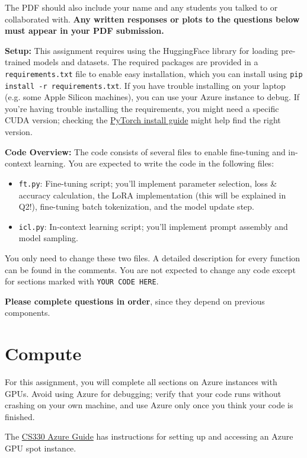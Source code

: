 \documentclass[12pt]{article}
\begin{document}
    The PDF should also include your name and any students you talked to or collaborated with. \textbf{Any written responses or plots to the questions below must appear in your PDF submission.}

    \textbf{Setup:} This assignment requires using the HuggingFace library for loading pre-trained models and datasets. The required packages are provided in a \texttt{requirements.txt} file to enable easy installation, which you can install using \texttt{pip install -r requirements.txt}. If you have trouble installing on your laptop (e.g. some Apple Silicon machines), you can use your Azure instance to debug. If you're having trouble installing the requirements, you might need a specific CUDA version; checking the \href{https://pytorch.org/get-started/locally/}{PyTorch install guide} might help find the right version.

    \textbf{Code Overview:} The code consists of several files to enable fine-tuning and in-context learning. You are expected to write the code in the following files:
    \begin{itemize}
        \item \texttt{ft.py}: Fine-tuning script; you'll implement parameter selection, loss \& accuracy calculation, the LoRA implementation (this will be explained in Q2!), fine-tuning batch tokenization, and the model update step.
        \item \texttt{icl.py}: In-context learning script; you'll implement prompt assembly and model sampling.
    \end{itemize}

    You only need to change these two files. A detailed description for every function can be found in the comments. You are not expected to change any code except for sections marked with \texttt{YOUR CODE HERE}.

    \textbf{Please complete questions in order}, since they depend on previous components.

    \section*{Compute}

    For this assignment, you will complete all sections on Azure instances with GPUs. Avoid using Azure for debugging; verify that your code runs without crashing on your own machine, and use Azure only once you think your code is finished.

    The \href{https://docs.google.com/document/d/1wm2m6gQtxgxXV5V7UUDUVOktJjOF_vzxJt29fdn8M5E/edit}{CS330 Azure Guide} has instructions for setting up and accessing an Azure GPU spot instance.
\end{document}
